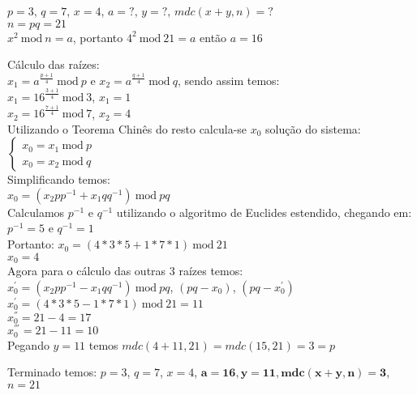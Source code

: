 \documentclass[12pt]{article}
\newcommand{\modd}{\ \text{mod}\ }
\begin{document}
\begin{itemize}
				$p = 3$, $q = 7$, $x = 4$, $a = ?$, $y = ?$, $mdc(x + y, n) = ?$\\
				$n = pq = 21$\\
				$x^2 \modd n = a$, portanto $4^2 \modd 21  = a$ então $a =  16$
				\newline
				\begin{center}
					Cálculo das raízes:\\
					$x_1 = a^{\frac{p+1}{4}} \modd p$	e 
					$x_2 = a^{\frac{q+1}{4}} \modd q$,
					sendo assim temos:\\
					$x_1 = 16^{\frac{3+1}{4}} \modd 3$, $x_1 = 1$\\
					$x_2 = 16^{\frac{7+1}{4}} \modd 7$, $x_2 = 4$\\
					Utilizando o Teorema Chinês do resto calcula-se $x_0$
					solução do sistema:
					$ \begin{cases} 
							x_0 = x_1 \modd p \\
							x_0 = x_2 \modd q 
						\end{cases}
					$\\
					Simplificando temos:\\
					$x_0 = (x_2pp^{-1} + x_1qq^{-1}) \modd pq$\\
					Calculamos $p^{-1}$ e $q^{-1}$ utilizando o algoritmo
					de Euclides estendido, chegando em:\\
					$p^{-1} = 5 $ e $q^{-1} = 1 $\\
					Portanto: $x_0 = (4*3*5 + 1*7*1) \modd 21$\\
					$x_0 = 4$\\
					Agora para o cálculo das outras 3 raízes temos:\\
					$x_0^{'} = (x_2pp^{-1} - x_1qq^{-1}) \modd pq$, $(pq - x_0)$,
					$(pq - x_0^{'})$\\
					$x_0^{'} = (4*3*5 - 1*7*1) \modd 21 = 11$\\
					$x_0^{''} = 21 - 4 = 17$\\
					$x_0^{'''} = 21 - 11 = 10$\\
					Pegando $y = 11$ temos $mdc(4+11, 21) = mdc(15, 21) = 3 = p$				
				\end{center} 	
				Terminado temos: 
				$p = 3$, $q = 7$, $x = 4$, $\mathbf{a = 16, y = 11, mdc(x + y, n) = 3}$,
				$n = 21$
		\end{itemize}
\end{document}
